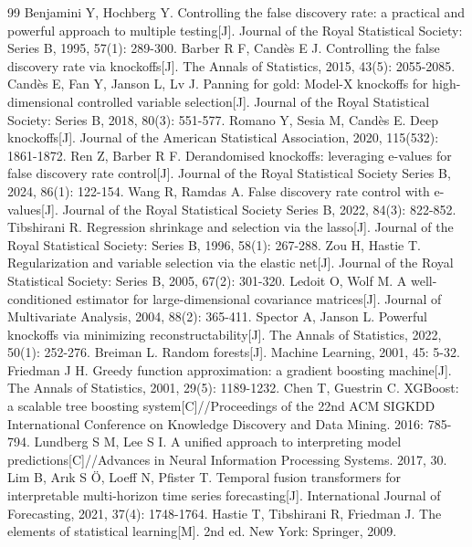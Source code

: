\documentclass{sufethesismas}
\begin{document}
\backmatter
\begin{thebibliography}{99}
 Benjamini Y, Hochberg Y. Controlling the false discovery rate: a practical and powerful approach to multiple testing[J]. Journal of the Royal Statistical Society: Series B, 1995, 57(1): 289-300.
 Barber R F, Candès E J. Controlling the false discovery rate via knockoffs[J]. The Annals of Statistics, 2015, 43(5): 2055-2085.
 Candès E, Fan Y, Janson L, Lv J. Panning for gold: Model-X knockoffs for high-dimensional controlled variable selection[J]. Journal of the Royal Statistical Society: Series B, 2018, 80(3): 551-577.
 Romano Y, Sesia M, Candès E. Deep knockoffs[J]. Journal of the American Statistical Association, 2020, 115(532): 1861-1872.
 Ren Z, Barber R F. Derandomised knockoffs: leveraging e-values for false discovery rate control[J]. Journal of the Royal Statistical Society Series B, 2024, 86(1): 122-154.
 Wang R, Ramdas A. False discovery rate control with e-values[J]. Journal of the Royal Statistical Society Series B, 2022, 84(3): 822-852.
 Tibshirani R. Regression shrinkage and selection via the lasso[J]. Journal of the Royal Statistical Society: Series B, 1996, 58(1): 267-288.
 Zou H, Hastie T. Regularization and variable selection via the elastic net[J]. Journal of the Royal Statistical Society: Series B, 2005, 67(2): 301-320.
 Ledoit O, Wolf M. A well-conditioned estimator for large-dimensional covariance matrices[J]. Journal of Multivariate Analysis, 2004, 88(2): 365-411.
 Spector A, Janson L. Powerful knockoffs via minimizing reconstructability[J]. The Annals of Statistics, 2022, 50(1): 252-276.
 Breiman L. Random forests[J]. Machine Learning, 2001, 45: 5-32.
 Friedman J H. Greedy function approximation: a gradient boosting machine[J]. The Annals of Statistics, 2001, 29(5): 1189-1232.
 Chen T, Guestrin C. XGBoost: a scalable tree boosting system[C]//Proceedings of the 22nd ACM SIGKDD International Conference on Knowledge Discovery and Data Mining. 2016: 785-794.
 Lundberg S M, Lee S I. A unified approach to interpreting model predictions[C]//Advances in Neural Information Processing Systems. 2017, 30.
 Lim B, Arık S Ö, Loeff N, Pfister T. Temporal fusion transformers for interpretable multi-horizon time series forecasting[J]. International Journal of Forecasting, 2021, 37(4): 1748-1764.
 Hastie T, Tibshirani R, Friedman J. The elements of statistical learning[M]. 2nd ed. New York: Springer, 2009.

\end{thebibliography}
\end{document}
